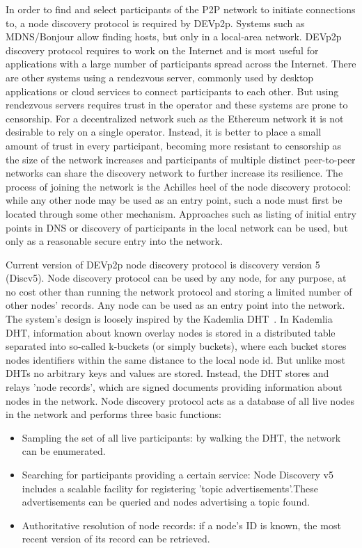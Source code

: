 In order to find and select participants of the P2P network to initiate connections to,  a node discovery protocol is required by DEVp2p.
Systems such as MDNS/Bonjour allow finding hosts,  but only in  a local-area network.  DEVp2p discovery protocol requires to work on the Internet and is most useful for applications with a large number of participants spread across the Internet.
There are other systems using a rendezvous server,  commonly used by desktop applications or cloud services to connect participants to each other. But using rendezvous servers requires trust in the operator and these systems are prone to censorship. 
For a decentralized network such as the Ethereum network it is not desirable to rely on a single operator.  
Instead,  it is better to place a small amount of trust in every participant, becoming more resistant to censorship as the size of the network increases and participants of multiple distinct peer-to-peer networks can share the discovery network to further increase its resilience.
The process of joining the network is the Achilles heel of the node discovery protocol: while any other node may be used as an entry point,  such a node must first be located through some other mechanism.  Approaches such as listing of initial entry points in DNS or discovery of participants in the local network can be used,  but only as a  reasonable secure entry into the network.


Current version of DEVp2p node discovery protocol is discovery version 5 (Discv5).
Node discovery protocol can be used by any node, for any purpose, at no cost other than running the network protocol and storing a limited number of other nodes' records. Any node can be used as an entry point into the network.
The system's design is loosely inspired by the Kademlia DHT~\cite{}.
In Kademlia DHT, information about known overlay nodes is stored in
a distributed table separated into so-called k-buckets (or simply buckets),  where each bucket stores nodes identifiers within the same distance to the local node id.
But unlike most DHTs no arbitrary keys and values are stored. Instead, the DHT stores and relays 'node records', which are signed documents providing information about nodes in the network. 
Node discovery protocol acts as a database of all live nodes in the network and performs three basic functions:

\begin{itemize}
 \item Sampling the set of all live participants: by walking the DHT,  the network can be enumerated.
 \item Searching for participants providing a certain service: Node Discovery v5 includes a scalable facility for registering 'topic advertisements'.These advertisements can be queried and nodes advertising a topic found.
 \item Authoritative resolution of node records: if a node's ID is known, the most recent version of its record can be retrieved.
\end{itemize}

